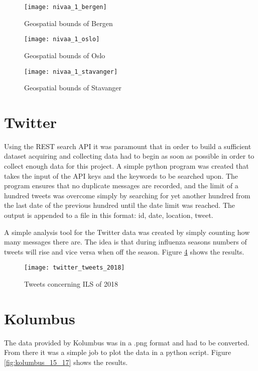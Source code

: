 \begin{figure}[ht]
\texttt{[image: nivaa\_1\_bergen]}
\centering
\caption{Geospatial bounds of Bergen}
\label{fig:boundsbergen}
\end{figure}

\begin{figure}[ht]
\texttt{[image: nivaa\_1\_oslo]}
\centering
\caption{Geospatial bounds of Oslo}
\label{fig:boundsoslo}
\end{figure}

\begin{figure}[ht]
\texttt{[image: nivaa\_1\_stavanger]}
\centering
\caption{Geospatial bounds of Stavanger}
\label{fig:boundsstavanger}
\end{figure}

\newpage\newpage

\section{Twitter}
Using the REST search API it was paramount that in order to build a sufficient dataset acquiring and collecting data had to begin as soon as possible in order to collect enough data for this project. A simple python program was created that takes the input of the API keys and the keywords to be searched upon. The program ensures that no duplicate messages are recorded, and the limit of a hundred tweets was overcome simply by searching for yet another hundred from the last date of the previous hundred until the date limit was reached.
The output is appended to a file in this format: id, date, location, tweet.

A simple analysis tool for the Twitter data was created by simply counting how many messages there are. The idea is that during influenza seasons numbers of tweets will rise and vice versa when off the season. Figure \ref{fig:twitterAnal} shows the results.

\begin{figure}[ht]
\texttt{[image: twitter\_tweets\_2018]}
\centering
\caption{Tweets concerning ILS of 2018}
\label{fig:twitterAnal}
\end{figure}

\section{Kolumbus}
The data provided by Kolumbus was in a .png format and had to be converted. From there it was a simple job to plot the data in a python script. Figure \ref{fig:kolumbus_15_17} shows the results.

